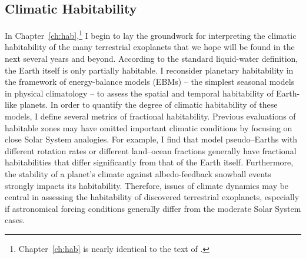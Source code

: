 \subsection[Climatic Habitability]{Climatic Habitability}
\label{intro_ssec:hab}
In Chapter~\ref{ch:hab},\footnote{Chapter~\ref{ch:hab} is nearly
  identical to the text of \citet{spiegel_et_al2007bb}.} I begin to
lay the groundwork for interpreting the climatic habitability of the
many terrestrial exoplanets that we hope will be found in the next
several years and beyond.  According to the standard liquid-water
definition, the Earth itself is only partially habitable.  I
reconsider planetary habitability in the framework of energy-balance
models (EBMs) -- the simplest seasonal models in physical climatology
-- to assess the spatial and temporal habitability of Earth-like
planets. In order to quantify the degree of climatic habitability of
these models, I define several metrics of fractional habitability.
Previous evaluations of habitable zones may have omitted important
climatic conditions by focusing on close Solar System analogies. For
example, I find that model pseudo--Earths with different rotation
rates or different land--ocean fractions generally have fractional
habitabilities that differ significantly from that of the Earth
itself.  Furthermore, the stability of a planet's climate against
albedo-feedback snowball events strongly impacts its
habitability. Therefore, issues of climate dynamics may be central in
assessing the habitability of discovered terrestrial exoplanets,
especially if astronomical forcing conditions generally differ from
the moderate Solar System cases.


